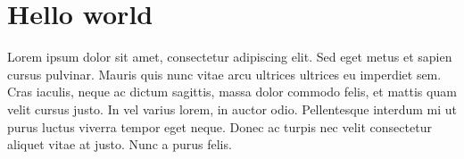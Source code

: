\chapter{Hello world}
Lorem ipsum dolor sit amet, consectetur adipiscing elit. Sed eget metus et sapien cursus pulvinar. Mauris quis nunc vitae arcu ultrices ultrices eu imperdiet sem. Cras iaculis, neque ac dictum sagittis, massa dolor commodo felis, et mattis quam velit cursus justo. In vel varius lorem, in auctor odio. Pellentesque interdum mi ut purus luctus viverra tempor eget neque. Donec ac turpis nec velit consectetur aliquet vitae at justo. Nunc a purus felis.
